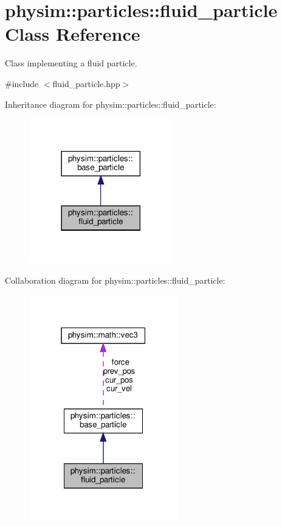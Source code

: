 \hypertarget{classphysim_1_1particles_1_1fluid__particle}{}\section{physim\+:\+:particles\+:\+:fluid\+\_\+particle Class Reference}
\label{classphysim_1_1particles_1_1fluid__particle}


Class implementing a fluid particle.  




{\ttfamily \#include $<$fluid\+\_\+particle.\+hpp$>$}



Inheritance diagram for physim\+:\+:particles\+:\+:fluid\+\_\+particle\+:\nopagebreak
\begin{figure}[H]
\begin{center}
\leavevmode
\includegraphics[width=177pt]{classphysim_1_1particles_1_1fluid__particle__inherit__graph}
\end{center}
\end{figure}


Collaboration diagram for physim\+:\+:particles\+:\+:fluid\+\_\+particle\+:\nopagebreak
\begin{figure}[H]
\begin{center}
\leavevmode
\includegraphics[width=183pt]{classphysim_1_1particles_1_1fluid__particle__coll__graph}
\end{center}
\end{figure}
